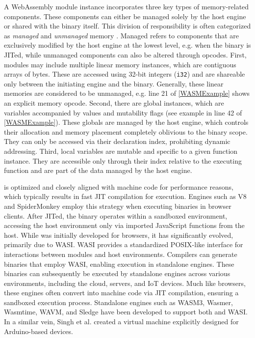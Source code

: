  A WebAssembly module instance incorporates three key types of memory-related components. 
These components can either be managed solely by the host engine or shared with the \Wasm binary itself. 
This division of responsibility is often categorized as \emph{managed} and \emph{unmanaged} memory \cite{usenixWasm2020}. 
Managed refers to components that are exclusively modified by the host engine at the lowest level, e.g. when the \Wasm binary is JITed, while unmanaged components can also be altered through  \Wasm opcodes.
First, modules may include multiple linear memory instances, which are contiguous arrays of bytes. 
These are accessed using 32-bit integers (\texttt{i32}) and are shareable only between the initiating engine and the \Wasm binary. 
Generally, these linear memories are considered to be unmanaged, e.g. line 21 of \autoref{WASMExample} shows an explicit memory opcode. 
Second, there are global instances, which are variables accompanied by values and mutability flags (see example in line 42 of \autoref{WASMExample}). 
These globals are managed by the host engine, which controls their allocation and memory placement completely oblivious to the \Wasm binary scope. 
They can only be accessed via their declaration index, prohibiting dynamic addressing. 
Third, local variables are mutable and specific to a given function instance. 
They are accessible only through their index relative to the executing function and are part of the data managed by the host engine.


 \Wasm is optimized and closely aligned with machine code for performance reasons, which typically results in fast JIT compilation for execution.
Engines such as V8 and SpiderMonkey employ this strategy when executing \Wasm binaries in browser clients. 
After JITed, the \Wasm binary operates within a sandboxed environment, accessing the host environment only via imported JavaScript functions from the host.
While \Wasm was initially developed for browsers, it has significantly evolved, primarily due to WASI\cite{WASI}. 
WASI provides a standardized POSIX-like interface for interactions between \Wasm modules and host environments. 
Compilers can generate \wasm binaries that employ WASI, enabling execution in standalone engines. 
These binaries can subsequently be executed by standalone engines across various environments, including the cloud, servers, and IoT devices. 
Much like browsers, these engines often convert \Wasm into machine code via JIT compilation, ensuring a sandboxed execution process. 
Standalone engines such as WASM3, Wasmer, Wasmtime, WAVM, and Sledge\cite{Sledge} have been developed to support both \Wasm and WASI. 
In a similar vein, Singh et al.\cite{WARDuino2019} created a \Wasm virtual machine explicitly designed for Arduino-based devices.



